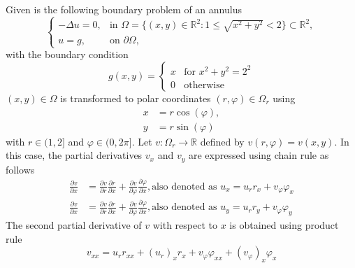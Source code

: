 \newcommand{\assignmentDate}{November 4th, 2019}




Given is the following boundary problem of an annulus
\begin{equation}
	\begin{cases}
		-\Delta u = 0, &\text{in } \Omega = \{(x,y) \in \mathbb{R}^2 : 1 \leq \sqrt{x^2 + y^2} < 2 \} \subset \mathbb{R}^2, \\
		u = g, &\text{on } \partial \Omega,
	\end{cases}
	\label{eq:annulus1}
\end{equation}
with the boundary condition
\begin{equation}
	g(x,y) = 
	\begin{cases}
		x &\text{for } x^2 +y^2 = 2^2\\
		0 &\text{otherwise}
	\end{cases}
\end{equation}
%
$(x,y) \in \Omega$ is transformed to polar coordinates $(r, \varphi) \in \Omega_r$ using
\begin{align}
	x &= r \cos{(\varphi)},\\
	y &= r \sin{(\varphi)}
\end{align}
with $r \in (1,2]$ and $\varphi \in (0, 2 \pi]$. Let $v:\Omega_r \to \mathbb{R}$ defined by $v(r,\varphi) = v(x,y)$.
In this case, the partial derivatives $v_x$ and $v_y$ are expressed using chain rule as follows
\begin{align}
	\label{eq:chainX}
	\frac{\partial v}{\partial x} &= \frac{\partial v}{\partial r} \frac{\partial r}{\partial x} +
									\frac{\partial v}{\partial \varphi} \frac{\partial \varphi}{\partial x}, \text{also denoted as } u_x = u_r r_x + v_\varphi \varphi_x\\
	\label{eq:chainY}
	\frac{\partial v}{\partial x} &= \frac{\partial v}{\partial r} \frac{\partial r}{\partial x} +
									\frac{\partial v}{\partial \varphi} \frac{\partial \varphi}{\partial x}, \text{also denoted as } u_y= u_r r_y + v_\varphi \varphi_y
\end{align}
%
The second partial derivative of $v$ with respect to $x$ is obtained using product rule
\begin{equation}
	v_{xx} = u_r r_{xx} + (u_r)_x r_x + v_\varphi \varphi_{xx} + (v_\varphi)_x \varphi_x
	\label{eq:uXX}
\end{equation}

